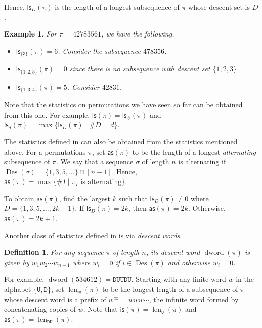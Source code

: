 \documentclass[12pt]{article}
\newcommand{\is}{\mathsf{is}}
\newcommand{\ls}{\mathsf{ls}}
\newcommand{\as}{\mathsf{as}}
\newcommand{\Des}{\operatorname{Des}}
\newcommand{\dword}{\operatorname{dword}}
\newcommand{\desword}[1]{\mathtt{#1}}
\newtheorem{definition}[theorem]{Definition}
\newtheorem{example}[theorem]{Example}
\theoremstyle{definition}
\begin{document}
Hence, $\ls_D(\pi)$ is the length of a longest subsequence of $\pi$ whose descent set is $D$.

\begin{example}
    For $\pi = 4 2 7 8 3 5 6 1$, we have the following.
    \begin{itemize}
        \item $\ls_{\{3\}}(\pi) = 6$. Consider the subsequence $4 7 8 3 5 6$.


        \item $\ls_{\{1, 2, 3\}}(\pi) = 0$ since there is no subsequence with descent set $\{1, 2, 3\}$.

        \item $\ls_{\{1, 3, 4\}}(\pi) = 5$. 
        Consider $4 2 8 3 1$.
    \end{itemize}
\end{example}

Note that the statistics on permutations we have seen so far can be obtained from this one. 
For example, $\is(\pi) = \ls_{\varnothing}(\pi)$ and $\ls_d(\pi) = \operatorname{max}\{\ls_D(\pi) \mid \#D = d\}$.

The statistics defined in \cite{stan_as} can also be obtained from the statistics mentioned above. 
For a permutations $\pi$, set $\as(\pi)$ to be the length of a longest \emph{alternating} subsequence of $\pi$. 
We say that a sequence $\sigma$ of length $n$ is alternating if $\Des(\sigma) = \{1, 3, 5, \ldots\} \cap [n - 1]$. 
Hence, $\as(\pi) = \max \{\#I \mid \pi_I\text{ is alternating}\}.$

To obtain $\as(\pi)$, find the largest $k$ such that $\ls_D(\pi) \neq 0$ where $D = \{1, 3, 5, \ldots, 2k - 1\}$. 
If $\ls_D(\pi) = 2k$, then $\as(\pi) = 2k$. 
Otherwise, $\as(\pi) = 2k + 1$.

Another class of statistics defined in \cite[Section 5]{stan_as} is via \emph{descent words}.

\begin{definition}\label{desword}
    For any sequence $\pi$ of length $n$, its descent word $\dword(\pi)$ is given by $w_1w_2 \cdots w_{n - 1}$ where $w_i = \desword{D}$ if $i \in \Des(\pi)$ and otherwise $w_i = \desword{U}$.
\end{definition}

For example, $\dword(534612) = \desword{DUUDU}$. 
Starting with any finite word $w$ in the alphabet $\{\desword{U}, \desword{D}\}$, set $\operatorname{len}_w(\pi)$ to be the longest length of a subsequence of $\pi$ whose descent word is a prefix of $w^\infty =www\cdots$, the infinite word formed by concatenating copies of $w$. 
Note that $\is(\pi) = \operatorname{len}_{\desword{U}}(\pi)$ and $\as(\pi) = \operatorname{len}_{\desword{DU}}(\pi)$.
\end{document}
